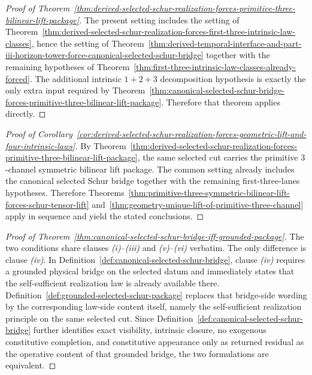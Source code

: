 \begin{proof}[Proof of Theorem~\ref{thm:derived-selected-schur-realization-forces-primitive-three-bilinear-lift-package}]
\label{proof:thm:derived-selected-schur-realization-forces-primitive-three-bilinear-lift-package}
The present setting includes the setting of
Theorem~\ref{thm:derived-selected-schur-realization-forces-first-three-intrinsic-law-classes},
hence the setting of
Theorem~\ref{thm:derived-temporal-interface-and-part-iii-horizon-tower-force-canonical-selected-schur-bridge}
together with the remaining hypotheses of
Theorem~\ref{thm:first-three-intrinsic-law-classes-already-forced}. The
additional intrinsic \(1+2+3\) decomposition hypothesis is exactly the only
extra input required by
Theorem~\ref{thm:canonical-selected-schur-bridge-forces-primitive-three-bilinear-lift-package}.
Therefore that theorem applies directly.
\end{proof}

\begin{proof}[Proof of Corollary~\ref{cor:derived-selected-schur-realization-forces-geometric-lift-and-four-intrinsic-laws}]
\label{proof:cor:derived-selected-schur-realization-forces-geometric-lift-and-four-intrinsic-laws}
By
Theorem~\ref{thm:derived-selected-schur-realization-forces-primitive-three-bilinear-lift-package},
the same selected cut carries the primitive \(3\)-channel symmetric bilinear
lift package. The common setting already includes the canonical selected Schur
bridge together with the remaining first-three-lanes hypotheses. Therefore
Theorems~\ref{thm:primitive-three-symmetric-bilinear-lift-forces-schur-tensor-lift}
and~\ref{thm:geometry-unique-lift-of-primitive-three-channel} apply in
sequence and yield the stated conclusions.
\end{proof}

\begin{proof}[Proof of Theorem~\ref{thm:canonical-selected-schur-bridge-iff-grounded-package}]
\label{proof:thm:canonical-selected-schur-bridge-iff-grounded-package}
The two conditions share clauses \emph{(i)}--\emph{(iii)} and
\emph{(v)}--\emph{(vi)} verbatim. The only difference is clause
\emph{(iv)}. In
Definition~\ref{def:canonical-selected-schur-bridge}, clause \emph{(iv)}
requires a grounded physical bridge on the selected datum and immediately
states that the self-sufficient realization law is already available there.
Definition~\ref{def:grounded-selected-schur-package} replaces that bridge-side
wording by the corresponding law-side content itself, namely the
self-sufficient realization principle on the same selected cut. Since
Definition~\ref{def:canonical-selected-schur-bridge} further identifies exact
visibility, intrinsic closure, no exogenous constitutive completion, and
constitutive appearance only as returned residual as the operative content of
that grounded bridge, the two formulations are equivalent.
\end{proof}

